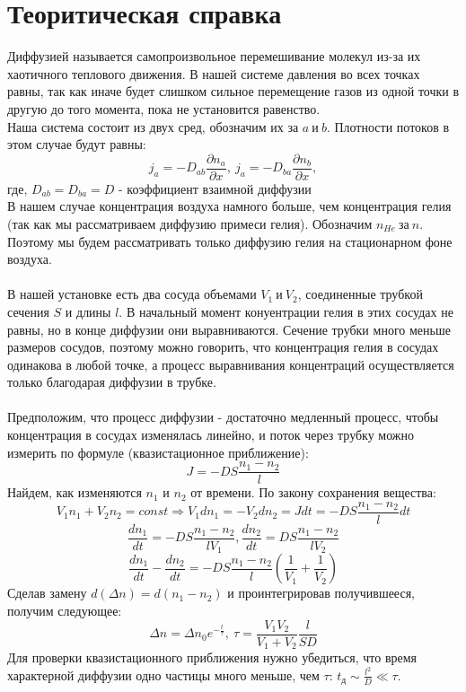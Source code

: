 \documentclass[a4paper, 12pt]{article}
\begin{document}
\section{Теоритическая справка}
Диффузией называется самопроизвольное перемешивание молекул из-за их хаотичного теплового движения. В нашей системе давления во всех точках равны, так как иначе будет слишком сильное перемещение газов из одной точки в другую до того момента, пока не установится равенство. \\
Наша система состоит из двух сред, обозначим их за \(a \ и \ b\). Плотности потоков в этом случае будут равны:
\[j_{a} = -D_{ab}\frac{\partial n_a}{\partial x}, \ j_{a} = -D_{ba}\frac{\partial n_b}{\partial x},\]
где, \(D_{ab} = D_{ba} = D\) - коэффициент взаимной диффузии\\
В нашем случае концентрация воздуха намного больше, чем концентрация гелия (так как мы рассматриваем диффузию примеси гелия). Обозначим \(n_{He} \ за \ n\). Поэтому мы будем рассматривать только диффузию гелия на стационарном фоне воздуха. \\
\\
В нашей установке есть два сосуда объемами \(V_1 \ и \ V_2\), соединенные трубкой сечения \(S\) и длины \(l\). В начальный момент конуентрации гелия в этих сосудах не равны, но в конце диффузии они выравниваются. Сечение трубки много меньше размеров сосудов, поэтому можно говорить, что концентрация гелия в сосудах одинакова в любой точке, а процесс выравнивания концентраций осуществляется только благодарая диффузии в трубке.
\\
\\
Предположим, что процесс диффузии - достаточно медленный процесс, чтобы концентрация в сосудах изменялась линейно, и поток через трубку можно измерить по формуле (квазистационное приближение):
\[J = -DS\frac{n_1 - n_2}{l}\]
Найдем, как изменяются $n_1$ и $n_2$ от времени. По закону сохранения вещества: \[V_1 n_1 + V_2 n_2 = const \Rightarrow V_1 dn_1 = - V_2 dn_2 = Jdt = -DS\frac{n_1 - n_2}{l}dt\]
\[\frac{dn_1}{dt} = -DS\frac{n_1 - n_2}{lV_1}, \frac{dn_2}{dt} = DS\frac{n_1 - n_2}{lV_2}\]
\[\frac{dn_1}{dt} - \frac{dn_2}{dt} = -DS\frac{n_1 - n_2}{l}(\frac{1}{V_1} + \frac{1}{V_2})\]
Сделав замену $d(\Delta n) = d(n_1 - n_2)$ и проинтегрировав получившееся, получим следующее: \[\Delta n = \Delta n_0 e^{-\frac{t}{\tau}}, \ \tau = \frac{V_1V_2}{V_1 + V_2} \frac{l}{SD}\]
Для проверки квазистационного приближения нужно убедиться, что время характерной диффузии одно частицы много меньше, чем \(\tau\): \(t_д \sim \frac{l^2}{D} \ll \tau\).
\end{document}
